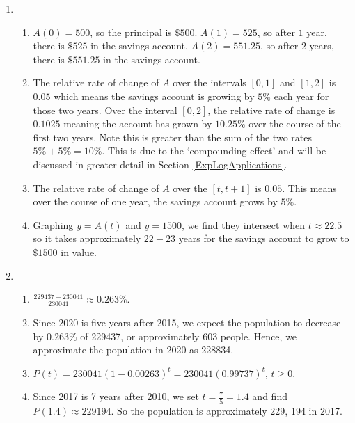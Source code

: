 \begin{enumerate}
\setcounter{enumi}{\value{HW}}

\item  \begin{enumerate}

\item   $A(0) = 500$, so the principal is $\$500$.  $A(1) = 525$, so after $1$ year, there is $\$525$ in the savings account.   $A(2) =551.25$, so after $2$ years, there is $\$551.25$ in the savings account. 

\item  The relative rate of change of $A$ over the intervals $[0,1]$ and $[1,2]$ is $0.05$ which means the savings account is growing by $5 \%$ each year for those two years.  Over the interval $[0,2]$, the relative rate of change is $0.1025$ meaning the account has grown by $10.25 \%$ over the course of the first two years.  Note this is greater than the sum of the two rates $5 \% + 5 \% = 10 \%$.  This is due to the `compounding effect' and will be discussed in greater detail in Section \ref{ExpLogApplications}.

\item  The relative rate of change of $A$ over the $[t, t+1]$ is $0.05$. This means over the course of one year, the savings account grows by $5 \%$.

\item Graphing $y= A(t)$ and $y = 1500$, we find they intersect when $t \approx 22.5$ so it takes approximately $22-23$ years for the savings account to grow to $\$1500$ in value.

\end{enumerate}

\item  \begin{enumerate}

\item $\frac{229437-230041}{230041} \approx 0.263 \%$.

\item  Since 2020 is five years after 2015, we expect the population to decrease by  $0.263 \%$ of 229437, or approximately 603 people.  Hence, we approximate the population in 2020 as 228834.

\item  $P(t) = 230041(1-0.00263)^t = 230041(0.99737)^{t}$, $t \geq 0$.

\item  Since 2017 is 7 years after 2010, we set $t = \frac{7}{5} = 1.4$ and find $P(1.4) \approx 229194$.  So the population is approximately 229, 194 in 2017.  


\end{enumerate}
\end{enumerate}
